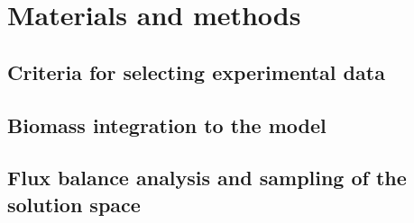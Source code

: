 \chapter{Materials and methods}

\section{Criteria for selecting experimental data}

\section{Biomass integration to the model}

\section{Flux balance analysis and sampling of the solution space}

